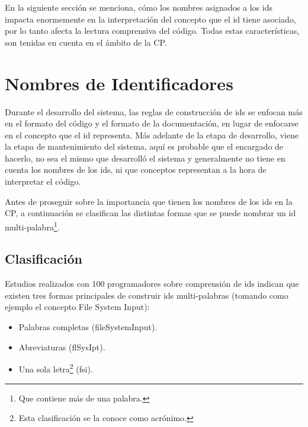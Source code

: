 En la siguiente sección se menciona, cómo los nombres asignados a los ids impacta enormemente en la interpretación del concepto que el id tiene asociado, por lo tanto afecta la lectura comprensiva del código. Todas estas características, son tenidas en cuenta en el ámbito de la CP.


\section{Nombres de Identificadores}

Durante el desarrollo del sistema, las reglas de construcción de ids se enfocan más en el formato del código y el formato de la documentación, en lugar de enfocarse en el concepto que el id representa. Más adelante de la etapa de desarrollo, viene la etapa de mantenimiento del sistema, aquí es probable que el encargado de hacerlo, no sea el mismo que desarrolló el sistema y generalmente no tiene en cuenta los nombres de los ids, ni que conceptos representan a la hora de interpretar el código.


Antes de proseguir sobre la importancia que tienen los nombres de los ids en la CP, a continuación se clasifican las distintas formas que se puede nombrar un id multi-palabra\footnote[1]{Que contiene más de una palabra.}.

\subsection{Clasificación}
\label{sec:clasif}%

Estudios realizados con 100 programadores \cite{DCHD06,LDMCFH07} sobre comprensión de ids indican que existen tres formas principales de construir ids multi-palabras (tomando como ejemplo el concepto \textsf{File System Input}): 

\begin{itemize}
\itemsep0em%
\item Palabras completas (\textsf{fileSystemInput}).
\item Abreviaturas (\textsf{flSysIpt}).
\item Una sola letra\footnote[2]{Esta clasificación se la conoce como acrónimo.} (\textsf{fsi}). 
\end{itemize}

